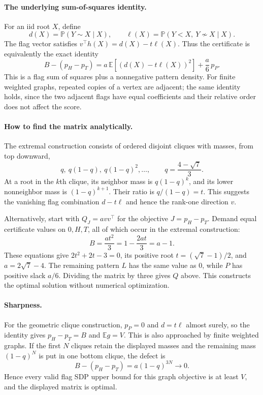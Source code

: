 \documentclass[11pt]{article}
\begin{document}
\paragraph{The underlying sum-of-squares identity.}
For an iid root $X$, define
\[
d(X)=\mathbb P(Y\sim X\mid X),\qquad
\ell(X)=\mathbb P(Y<X,\ Y\not\sim X\mid X).
\]
The flag vector satisfies $v^\top h(X)=d(X)-t\ell(X)$.
Thus the certificate is equivalently the exact identity
\[
\boxed{
B-(p_H-p_T)
=a\,\mathbb E[(d(X)-t\ell(X))^2]+\frac a6\,p_P.
}
\]
This is a flag sum of squares plus a nonnegative pattern density.
For finite weighted graphs, repeated copies of a vertex are adjacent;
the same identity holds, since the two adjacent flags have equal
coefficients and their relative order does not affect the score.

\paragraph{How to find the matrix analytically.}
The extremal construction consists of ordered disjoint cliques with masses,
from top downward,
\[
q,\ q(1-q),\ q(1-q)^2,\ldots,
\qquad q=\frac{4-\sqrt7}{3}.
\]
At a root in the $k$th clique, its neighbor mass is $q(1-q)^k$, and
its lower nonneighbor mass is $(1-q)^{k+1}$. Their ratio is
$q/(1-q)=t$. This suggests the vanishing flag combination $d-t\ell$
and hence the rank-one direction $v$.

Alternatively, start with $Q_J=a vv^\top$ for the objective $J=p_H-p_T$.
Demand equal certificate values on $0,H,T$, all of which occur in the
extremal construction:
\[
B=\frac{at^2}{3}=1-\frac{2at}{3}=a-1.
\]
These equations give $2t^2+2t-3=0$, its positive root
$t=(\sqrt7-1)/2$, and $a=2\sqrt7-4$.
The remaining pattern $L$ has the same value as $0$, while $P$ has
positive slack $a/6$. Dividing the matrix by three gives $Q$ above.
This constructs the optimal solution without numerical optimization.

\paragraph{Sharpness.}
For the geometric clique construction, $p_P=0$ and $d=t\ell$ almost
surely, so the identity gives $p_H-p_T=B$ and $\mathbb E g=V$.
This is also approached by finite weighted graphs. If the first $N$
cliques retain the displayed masses and the remaining mass $(1-q)^N$
is put in one bottom clique, the defect is
\[
B-(p_H-p_T)=a(1-q)^{3N}\longrightarrow0.
\]
Hence every valid flag SDP upper bound for this graph objective is at
least $V$, and the displayed matrix is optimal.
\end{document}
